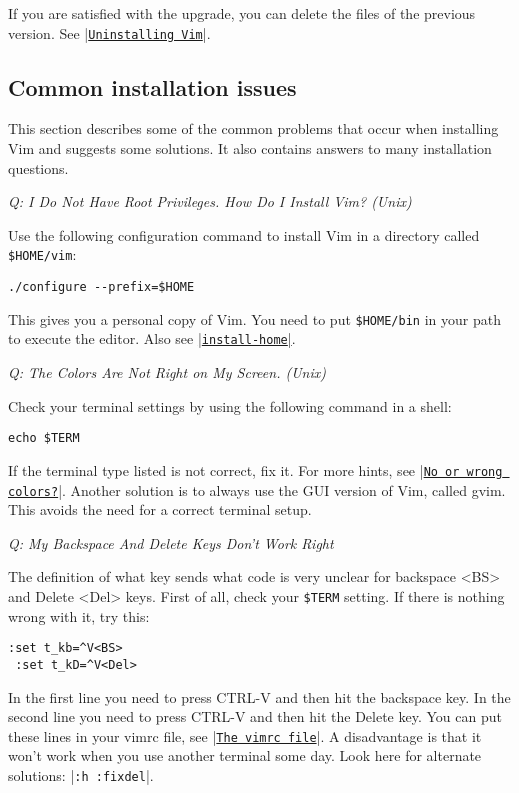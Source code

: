 If you are satisfied with the upgrade, you can delete the files of the previous version.
See |\hyperref[Uninstalling Vim]{\texttt{Uninstalling Vim}}|.
\subsection{Common installation issues}
This section describes some of the common problems that occur when installing Vim and suggests some solutions.
It also contains answers to many installation questions.

\textit{Q: I Do Not Have Root Privileges.  How Do I Install Vim? (Unix)}

Use the following configuration command to install Vim in a directory called \texttt{\$HOME/vim}:

\begin{Verbatim}[samepage=true]
 ./configure --prefix=$HOME
\end{Verbatim}

This gives you a personal copy of Vim.  You need to put \texttt{\$HOME/bin} in your
path to execute the editor.  Also see \hyperref[install-home]{|\texttt{install-home}|}.

\textit{Q: The Colors Are Not Right on My Screen. (Unix)}

Check your terminal settings by using the following command in a shell:

\begin{Verbatim}[samepage=true]
 echo $TERM
\end{Verbatim}

If the terminal type listed is not correct, fix it.
For more hints, see |\hyperref[No or wrong colors?]{\texttt{No or wrong colors?}}|.
Another solution is to always use the GUI version of Vim, called gvim.
This avoids the need for a correct terminal setup.

\textit{Q: My Backspace And Delete Keys Don't Work Right}

The definition of what key sends what code is very unclear for backspace <BS> and Delete <Del> keys.
First of all, check your \texttt{\$TERM} setting.
If there is nothing wrong with it, try this:

\begin{Verbatim}[samepage=true]
 :set t_kb=^V<BS>
 :set t_kD=^V<Del>
\end{Verbatim}

In the first line you need to press CTRL-V and then hit the backspace key.
In the second line you need to press CTRL-V and then hit the Delete key.
You can put these lines in your vimrc file, see |\hyperref[The vimrc file]{\texttt{The vimrc file}}|.
A disadvantage is that it won't work when you use another terminal some day.
Look here for alternate solutions: |\texttt{:h :fixdel}|.

